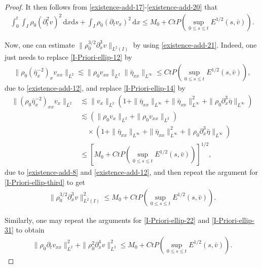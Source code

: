 \documentclass[11pt, reqno]{amsart}
\newcommand{\diff}{\mathrm{d}}
\numberwithin{equation}{section}
\begin{document}
{\begin{proof}
It then follows from \eqref{existence-add-17}-\eqref{existence-add-20} that
\begin{equation}\label{existence-add-21}
\begin{aligned}
\int_0^t\int_I \rho_0(\partial_t^2v)^2\,\diff x\diff s
+\int_I\rho_0(\partial_tv_x)^2\,\diff x
\leq M_0+Ct P(\sup_{0\leq s\leq t}E^{1/2}(s,\bar{v})).
\end{aligned}
\end{equation}

\bigskip
{} Now, one can estimate \(\|\rho_0^{3/2}\partial_x^3v\|_{L^2(I)}\) by using \eqref{existence-add-21}.  Indeed, one just needs to replace \eqref{I-Priori-ellip-12} by
\begin{equation*}
\begin{aligned}
\|\rho_0(\bar{\eta}_x^{-2})_{x}v_{xx}\|_{L^2}
\lesssim \|\rho_0v_{xx}\|_{L^2}\|\bar{\eta}_{xx}\|_{L^\infty}
\leq Ct P(\sup_{0\leq s\leq t}E^{1/2}(s,\bar{v})),
\end{aligned}
\end{equation*}
due to \eqref{existence-add-12}, and replace \eqref{I-Priori-ellip-14} by 
\begin{equation*}
\begin{aligned}
\|(\rho_0\bar{\eta}_x^{-2})_{xx}v_x\|_{L^2}
&\lesssim \|v_x\|_{L^2}(1+\|\bar{\eta}_{xx}\|_{L^\infty}
+\|\bar{\eta}_{xx}\|_{L^\infty}^2
+\|\rho_0\partial_x^3\bar{\eta}\|_{L^\infty})\\
&\lesssim (\|\rho_0v_x\|_{L^2}+\|\rho_0v_{xx}\|_{L^2})\\
&\quad\times(1+\|\bar{\eta}_{xx}\|_{L^\infty}
+\|\bar{\eta}_{xx}\|_{L^\infty}^2
+\|\rho_0\partial_x^3\bar{\eta}\|_{L^\infty})\\
&\leq [M_0+Ct P(\sup_{0\leq s\leq t}E^{1/2}(s,\bar{v}))]^{1/2},
\end{aligned}
\end{equation*}
due to \eqref{existence-add-8} and \eqref{existence-add-12}, 
and then repeat the argument for \eqref{I-Priori-ellip-third} to get 
\begin{equation}\label{existence-add-23}
\begin{aligned}
\|\rho_0^{3/2}\partial_x^3v\|_{L^2(I)}^2\leq M_0+Ct P(\sup_{0\leq s\leq t}E^{1/2}(s,\bar{v})). 
\end{aligned}
\end{equation}

Similarly, one may repeat the arguments for \eqref{I-Priori-ellip-22} and \eqref{I-Priori-ellip-31} to obtain   
\begin{equation}\label{existence-add-24}
\begin{aligned}
\|\rho_0\partial_tv_{xx}\|_{L^2}^2+\|\rho_0^2\partial_x^4v\|_{L^2}^2
\leq M_0+Ct P(\sup_{0\leq s\leq t}E^{1/2}(s,\bar{v})). 
\end{aligned}
\end{equation}






\end{proof}}
\end{document}
